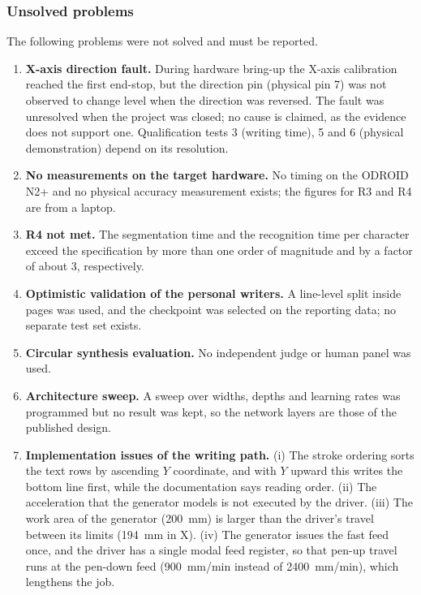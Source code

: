     \subsubsection{Unsolved problems}
    \label{sec:dis-unsolved}

        The following problems were not solved and must be reported.

        \begin{enumerate}
          \item \textbf{X-axis direction fault.} During hardware bring-up the X-axis calibration reached the first end-stop, but the direction pin (physical pin 7) was not observed to change level when the direction was reversed.
          The fault was unresolved when the project was closed; no cause is claimed, as the evidence does not support one.
          Qualification tests 3 (writing time), 5 and 6 (physical demonstration) depend on its resolution.
          \item \textbf{No measurements on the target hardware.} No timing on the ODROID N2+ and no physical accuracy measurement exists; the figures for R3 and R4 are from a laptop.
          \item \textbf{R4 not met.} The segmentation time and the recognition time per character exceed the specification by more than one order of magnitude and by a factor of about 3, respectively.
          \item \textbf{Optimistic validation of the personal writers.} A line-level split inside pages was used, and the checkpoint was selected on the reporting data; no separate test set exists.
          \item \textbf{Circular synthesis evaluation.} No independent judge or human panel was used.
          \item \textbf{Architecture sweep.} A sweep over widths, depths and learning rates was programmed but no result was kept, so the network layers are those of the published design.
          \item \textbf{Implementation issues of the writing path.} (i) The stroke ordering sorts the text rows by ascending $Y$ coordinate, and with $Y$ upward this writes the bottom line first, while the documentation says reading order. (ii) The acceleration that the generator models is not executed by the driver. (iii) The work area of the generator (200~mm) is larger than the driver's travel between its limits (194~mm in X). (iv) The generator issues the fast feed once, and the driver has a single modal feed register, so that pen-up travel runs at the pen-down feed (900~mm/min instead of 2400~mm/min), which lengthens the job.

\end{enumerate}
